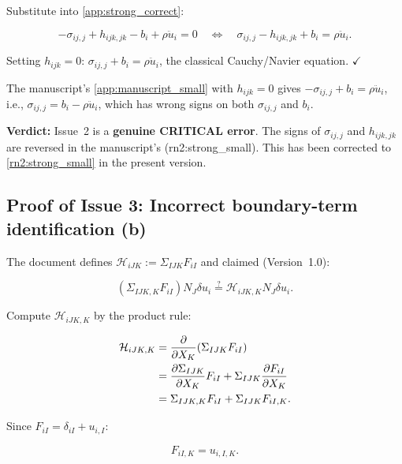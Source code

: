 \documentclass[11pt]{article}
\begin{document}
Substitute into \eqref{app:strong_correct}:

\begin{equation}
-\sigma_{ij,j}+h_{ijk,jk}-b_i+\rho\ddot{u}_i=0
\quad\Longleftrightarrow\quad
\boxed{\sigma_{ij,j}-h_{ijk,jk}+b_i=\rho\ddot{u}_i}.
\label{app:correct_small}
\end{equation}

Setting $h_{ijk}=0$: $\sigma_{ij,j}+b_i=\rho\ddot{u}_i$, the classical Cauchy/Navier equation. $\checkmark$

The manuscript's \eqref{app:manuscript_small} with $h_{ijk}=0$ gives $-\sigma_{ij,j}+b_i=\rho\ddot{u}_i$, i.e., $\sigma_{ij,j}=b_i-\rho\ddot{u}_i$, which has wrong signs on both $\sigma_{ij,j}$ and $b_i$.

\textbf{Verdict:} Issue~2 is a \textbf{genuine CRITICAL error}. The signs of $\sigma_{ij,j}$ and $h_{ijk,jk}$ are reversed in the manuscript's (rn2:strong\_small). This has been corrected to \eqref{rn2:strong_small} in the present version.

\subsection{Proof of Issue 3: Incorrect boundary-term identification (b)}
\label{app:proof3}

The document defines $\mathcal{H}_{iJK}:=\Sigma_{IJK}F_{iI}$ and claimed (Version~1.0):

\begin{equation}
(\Sigma_{IJK,K}F_{iI})N_J\delta u_i
\stackrel{?}{=}
\mathcal{H}_{iJK,K}N_J\delta u_i.
\label{app:claim3}
\end{equation}

Compute $\mathcal{H}_{iJK,K}$ by the product rule:

\begin{align}
\mathcal{H}_{iJK,K}
&= \frac{\partial}{\partial X_K}(\Sigma_{IJK}F_{iI}) \notag\\
&= \frac{\partial\Sigma_{IJK}}{\partial X_K}F_{iI}
   + \Sigma_{IJK}\frac{\partial F_{iI}}{\partial X_K} \notag\\
&= \Sigma_{IJK,K}F_{iI} + \Sigma_{IJK}F_{iI,K}.
\label{app:product_rule_H}
\end{align}

Since $F_{iI}=\delta_{iI}+u_{i,I}$:

\begin{equation}
F_{iI,K}=u_{i,I,K}.
\end{equation}
\end{document}
